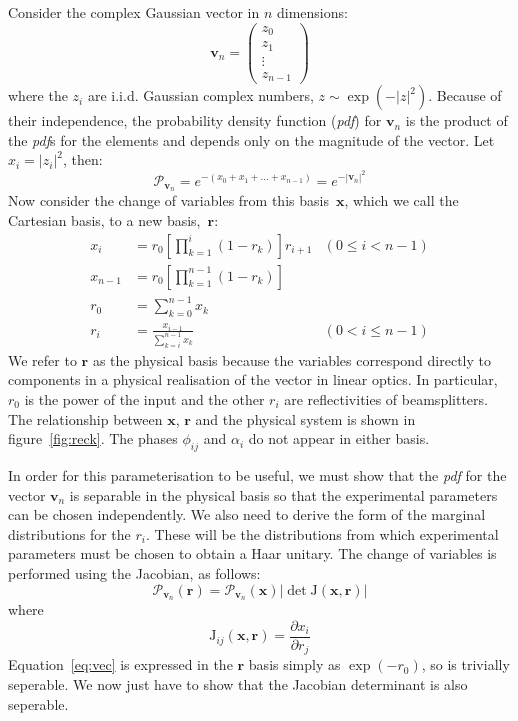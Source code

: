 \documentclass[aps,prl,twocolumn]{revtex4}
\renewcommand{\vec}[1]{\mathbf{#1}}
\newcommand{\mat}[1]{\mathrm{#1}}
\newcommand{\of}[1]{\!\left(#1\right)}
\newcommand{\pdf}{{\it pdf}}
\newcommand{\abs}[1]{\left|#1\right|}
\newcommand{\prob}[1]{\mathcal{#1}}
\begin{document}
Consider the complex Gaussian vector in \(n\) dimensions:
\begin{equation}
  \vec{v}_n = \begin{pmatrix}
    z_0 \\
    z_1 \\
    \vdots \\
    z_{n-1}
  \end{pmatrix}
\end{equation}
where the \(z_i\) are i.i.d. Gaussian complex numbers, \( z \sim \exp \left(
-\abs{z}^2 \right) \). Because of their independence, the probability
density function (\pdf{}) for \(\vec{v}_n\) is the product of the \pdf{}s for
the elements and depends only on the magnitude of the vector. Let \(x_i
= \abs{z_i}^2 \), then:
\begin{equation}
  \label{eq:vec}
  \prob{P}_{\vec{v}_n} = e^{ -\left(x_0 + x_1 + \dots + x_{n-1} \right)} = e^{
  -\abs{\vec{v}_n}^2}
\end{equation}
Now consider the change of variables from this basis~\(\vec{x}\), which we call
the Cartesian basis, to a new basis,~\(\vec{r}\):
\begin{align}
  x_i &= r_0 \left[ \prod_{k=1}^{i} \left( 1-r_k \right) \right] r_{i+1} &
    \left( 0 \leq i < n-1 \right) \\
  x_{n-1} &= r_0 \left[ \prod_{k=1}^{n-1} \left( 1-r_k \right) \right] \\
  r_0 &= \sum_{k=0}^{n-1} x_k \\
  r_i &= \frac{x_{i-1}}{\sum_{k=i}^{n-1} x_k} & \left( 0 < i \leq n-1 \right)
\end{align}
We refer to \(\vec{r}\) as the physical basis because the variables
correspond directly to components in a physical realisation of the vector in
linear optics. In particular, \(r_0\) is the power of the input and the other
\(r_i\) are reflectivities of beamsplitters. The relationship between
\(\vec{x}\), \(\vec{r}\) and the physical system is shown in
figure~\ref{fig:reck}. The phases \(\phi_{ij}\) and \(\alpha_i\) do
not appear in either basis.

In order for this parameterisation to be useful, we must show that the \pdf{}
for the vector \(\vec{v}_n\) is separable in the physical basis so that the
experimental parameters can be chosen independently. We also need to derive the
form of the marginal distributions for the \(r_i\). These will be the
distributions from which experimental parameters must be chosen to obtain a Haar
unitary. The change of variables is performed using the Jacobian, as follows:
\begin{equation}
  \prob{P}_{\vec{v}_n} \of{\vec{r}} = \prob{P}_{\vec{v}_n} \of{\vec{x}}
  \abs{\det \mat{J} \of{\vec{x}, \vec{r}}}
\end{equation}
where
\begin{equation}
  \mat{J}_{ij} \of{\vec{x}, \vec{r}} = \frac{\partial x_{i}}{\partial r_j}
\end{equation}
Equation~\ref{eq:vec} is expressed in the \(\vec{r}\) basis simply as \(\exp
\of{-r_0}\), so is trivially seperable. We now just have to show that the
Jacobian determinant is also seperable.
\end{document}
